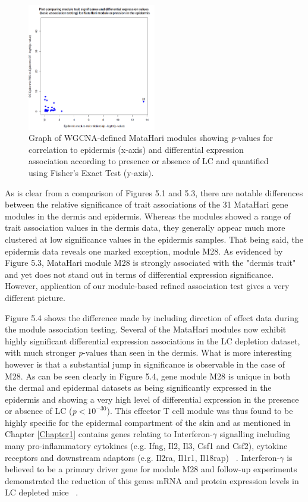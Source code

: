 \begin{figure}[H] 
    \centering
\includegraphics[width=0.5\textwidth]{Figures/Chapter5/Epidermis_trait_vs_DE_BASIC.png}
\caption{\small{Graph of WGCNA-defined MataHari modules showing \textit{p}-values for correlation to epidermis (x-axis) and differential expression association according to presence or absence of LC and quantified using Fisher's Exact Test (y-axis).} }
    \label{fig:25}
\end{figure}

As is clear from a comparison of Figures 5.1 and 5.3, there are notable differences between the relative significance of trait associations of the 31 MataHari gene modules in the dermis and epidermis. Whereas the modules showed a range of trait association values in the dermis data, they generally appear much more clustered at low significance values in the epidermis samples. That being said, the epidermis data reveals one marked exception, module M28. As evidenced by Figure 5.3, MataHari module M28 is strongly associated with the "dermis trait" and yet does not stand out in terms of differential expression significance. However, application of our module-based refined association test gives a very different picture. 

Figure 5.4 shows the difference made by including direction of effect data during the module association testing. Several of the MataHari modules now exhibit highly significant differential expression associations in the LC depletion dataset, with much stronger \textit{p}-values than seen in the dermis. What is more interesting however is that a substantial jump in significance is observable in the case of M28. As can be seen clearly in Figure 5.4, gene module M28 is unique in both the dermal and epidermal datasets as being significantly expressed in the epidermis and showing a very high level of differential expression in the presence or absence of LC (\textit{p}$<10^{-30}$). This effector T cell module was thus found to be highly specific for the epidermal compartment of the skin and as mentioned in Chapter \ref{Chapter1} contains genes relating to Interferon-$\gamma$ signalling including many pro-inflammatory cytokines (e.g. Ifng, Il2, Il3, Csf1 and Csf2), cytokine receptors and downstream adaptors (e.g. Il2ra, Il1r1, Il18rap) ~\autocite{Santos}.  Interferon-$\gamma$ is believed to be a primary driver gene for module M28 and follow-up experiments demonstrated the reduction of this genes mRNA and protein expression levels in LC depleted mice ~\autocite{Santos}. 

